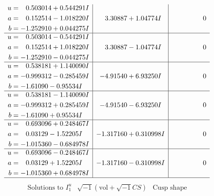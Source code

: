 \documentclass[1p]{elsarticle_modified}
\theoremstyle{definition}
\newcommand{\I}{\sqrt{-1}}
\begin{document}
$$\begin{array}{c|c|c}
\begin{aligned}
u &= \phantom{-}0.503014 + 0.544291 I \\
a &= \phantom{-}0.152514 - 1.018220 I \\
b &= -1.252910 + 0.044275 I\end{aligned}
 & \phantom{-}3.30887 + 1.04774 I & \phantom{-0.000000 } 0 \\ \hline\begin{aligned}
u &= \phantom{-}0.503014 - 0.544291 I \\
a &= \phantom{-}0.152514 + 1.018220 I \\
b &= -1.252910 - 0.044275 I\end{aligned}
 & \phantom{-}3.30887 - 1.04774 I & \phantom{-0.000000 } 0 \\ \hline\begin{aligned}
u &= \phantom{-}0.538181 + 1.140090 I \\
a &= -0.999312 - 0.285459 I \\
b &= -1.61090 - 0.95534 I\end{aligned}
 & -4.91540 + 6.93250 I & \phantom{-0.000000 } 0 \\ \hline\begin{aligned}
u &= \phantom{-}0.538181 - 1.140090 I \\
a &= -0.999312 + 0.285459 I \\
b &= -1.61090 + 0.95534 I\end{aligned}
 & -4.91540 - 6.93250 I & \phantom{-0.000000 } 0 \\ \hline\begin{aligned}
u &= \phantom{-}0.693096 + 0.248467 I \\
a &= \phantom{-}0.03129 - 1.52205 I \\
b &= -1.015360 - 0.684978 I\end{aligned}
 & -1.317160 + 0.310998 I & \phantom{-0.000000 } 0 \\ \hline\begin{aligned}
u &= \phantom{-}0.693096 - 0.248467 I \\
a &= \phantom{-}0.03129 + 1.52205 I \\
b &= -1.015360 + 0.684978 I\end{aligned}
 & -1.317160 - 0.310998 I & \phantom{-0.000000 } 0\\
 \hline 
 \end{array}$$\newpage$$\begin{array}{c|c|c}  
\text{Solutions to }I^u_{1}& \I (\text{vol} + \sqrt{-1}CS) & \text{Cusp shape}\\
 \hline 
\begin{aligned}

\end{aligned}
\end{array}$$
\end{document}
